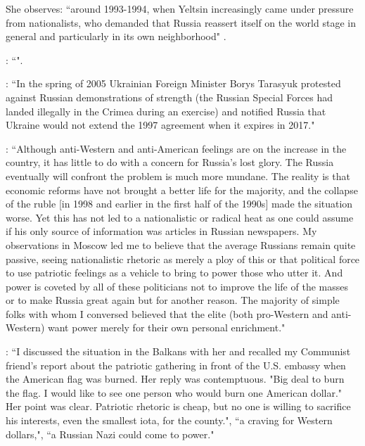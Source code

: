 She observes: ``around 1993-1994, when Yeltsin increasingly came under pressure from nationalists, who demanded that Russia reassert itself on the world stage in general and particularly in its own neighborhood" \citep[p.~125]{hancock2009}. 

\citep{dunlop1997}: ``".

\citep[p.~61]{lachowski2007}: ``In the spring of 2005 Ukrainian Foreign Minister Borys Tarasyuk protested against Russian demonstrations of strength (the Russian Special Forces had landed 
illegally in the Crimea during an exercise) and notified Russia that Ukraine would 
not extend the 1997 agreement when it expires in 2017."

\citep{shlapentokh2000}: ``Although anti-Western and anti-American feelings are on the increase
in the country, it has little to do with a concern for Russia's lost glory. The
Russia eventually will confront the problem is much more mundane. The reality is that economic reforms have not brought a better life for the majority, and the collapse of the ruble [in 1998 and earlier in the first half of the 1990s] made the situation worse. Yet this has not led to a nationalistic or radical heat as one could assume
if his only source of information was articles in Russian newspapers. My observations in Moscow led me to believe that the average Russians remain quite passive, seeing nationalistic rhetoric as merely a ploy of this or that political force to use patriotic feelings as a vehicle to bring to power those who utter it. And power is coveted by all of these politicians not to improve the life of the masses or to make Russia great again but for another reason. The majority of simple folks with whom I conversed believed that the elite
(both pro-Western and anti-Western) want power merely for their own personal enrichment."

\citep{shlapentokh2000}: ``I discussed the situation in the Balkans with her and recalled my
Communist friend's report about the patriotic gathering in front of the U.S. embassy when the American flag was burned. Her reply was contemptuous.
"Big deal to burn the flag. I would like to see
one person who would burn one American
dollar." Her point was clear. Patriotic rhetoric
is cheap, but no one is willing to sacrifice his
interests, even the smallest iota, for the
county.", ``a craving for Western dollars,", ``a Russian Nazi could come to power."